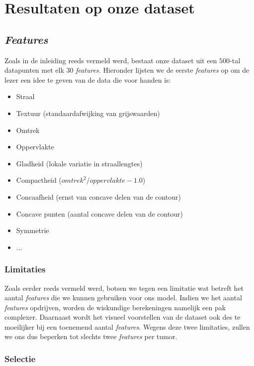 \documentclass[twoside, kulak]{kulakreport}
\begin{document}
	\chapter{Resultaten op onze dataset}
	
	\section{\textit{Features}}
	
	Zoals in de inleiding reeds vermeld werd, bestaat onze dataset uit een \(500\)-tal datapunten met elk \(30\) \textit{features}. Hieronder lijsten we de eerste \textit{features} op om de lezer een idee te geven van de data die voor handen is:
	
	\begin{itemize}
		\item Straal
		\item Textuur (standaardafwijking van grijswaarden)
		\item Omtrek
		\item Oppervlakte
		\item Gladheid (lokale variatie in straallengtes)
		\item Compactheid (\(omtrek^2 / oppervlakte - 1.0\))
		\item Concaafheid (ernst van concave delen van de contour)
		\item Concave punten (aantal concave delen van de contour)
		\item Symmetrie
		\item ...
	\end{itemize}
	
	\subsection{Limitaties}
	
	Zoals eerder reeds vermeld werd, botsen we tegen een limitatie wat betreft het aantal \textit{features} die we kunnen gebruiken voor ons model. Indien we het aantal \textit{features} opdrijven, worden de wiskundige berekeningen namelijk een pak complexer. Daarnaast wordt het visueel voorstellen van de dataset ook des te moeilijker bij een toenemend aantal \textit{features}. Wegens deze twee limitaties, zullen we ons dus beperken tot slechts twee \textit{features} per tumor.
	
	\subsection{Selectie}
	
\end{document}
